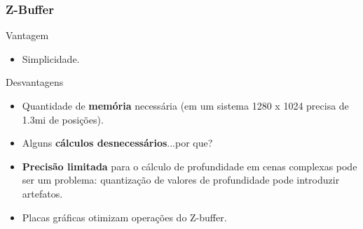 \documentclass{beamer}
\begin{document}
\begin{frame}[fragile]
\frametitle{Z-Buffer}

		\begin{block}{Vantagem}
			\begin{itemize}	
				\item Simplicidade.
			\end{itemize}
		\end{block}
		
		\begin{block}{Desvantagens}
			\begin{itemize}		
				\item Quantidade de \textbf{memória} necessária (em um sistema 1280 x 1024 precisa de 1.3mi de posições).
				\item Alguns \textbf{cálculos desnecessários}...por que?
				\item \textbf{Precisão limitada} para o cálculo de profundidade em cenas complexas pode ser um problema: quantização de valores de profundidade pode introduzir artefatos.
			\end{itemize}
		\end{block}
		
		\begin{block}{}
			\begin{itemize}		
				\item Placas gráficas otimizam operações do Z-buffer.
			\end{itemize}
		\end{block}
		
\end{frame}

\end{document}
